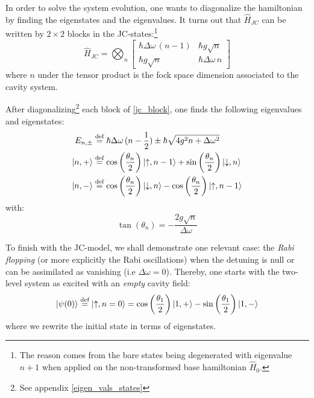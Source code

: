 \documentclass[10pt]{report}
\DeclarePairedDelimiter\ket{\lvert}{\rangle}
\begin{document}
In order to solve the system evolution, one wants to diagonalize the hamiltonian by finding the eigenstates and the eigenvalues. It turns out that $\hat{H}_{JC}$ can be written by $2\times 2$ blocks in the JC-states:\footnote{The reason comes from the bare states being degenerated with eigenvalue $n+1$ when applied on the non-transformed base hamiltonian $\hat{H}_0$.}
\begin{equation}
\label{jc_block}
\hat{H}_{JC} = \bigotimes_n \begin{bmatrix}
\hbar \Delta\omega \, (n-1) & \hbar g \sqrt{n}\\
\hbar g \sqrt{n} & \hbar \Delta\omega \, n
\end{bmatrix}
\end{equation}
where $n$ under the tensor product is the fock space dimension associated to the cavity system.

After diagonalizing\footnote{See appendix \ref{eigen_vals_states}} each block of \eqref{jc_block}, one finds the following eigenvalues and eigenstates:
\begin{align}
\label{jc_eigens}
E_{n, \pm} &\stackrel{\text{def}}{=} \hbar\Delta\omega\,(n-\frac{1}{2}) \pm \hbar\sqrt{4g^2n + \Delta\omega ^2}\\
\ket{n, +} &\stackrel{\text{def}}{=} \cos\left(\frac{\theta_n}{2}\right) \ket{\uparrow, n - 1}  + \sin\left(\frac{\theta_n}{2}\right) \ket{\downarrow, n}\\
\ket{n, -} &\stackrel{\text{def}}{=} \cos\left(\frac{\theta_n}{2}\right) \ket{\downarrow, n}  - \cos\left(\frac{\theta_n}{2}\right) \ket{\uparrow, n - 1}
\end{align}
with:
\begin{equation}
\label{tan_theta_n}
\tan\left(\theta_n\right) = -\frac{2g\sqrt{n}}{\Delta\omega}
\end{equation}

To finish with the JC-model, we shall demonstrate one relevant case: the \textit{Rabi flopping} (or more explicitly the Rabi oscillations) when the detuning is null or can be assimilated as vanishing (i.e $\Delta\omega = 0$). Thereby, one starts with the two-level system as excited with an \textit{empty} cavity field:
\begin{equation}
\ket{\psi(0)} \stackrel{\text{def}}{=} \ket{\uparrow, n = 0} = \cos\left(\frac{\theta_{1}}{2}\right) \ket{1, +} - \sin\left(\frac{\theta_{1}}{2}\right) \ket{1, -}
\end{equation}
where we rewrite the initial state in terms of eigenstates.
\end{document}

